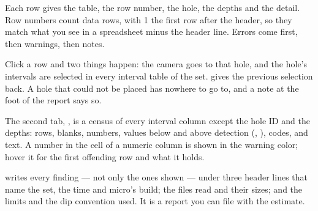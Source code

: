 Each row gives the table, the row number, the hole, the depths and the detail. Row numbers count data rows, with 1 the first row after the header, so they match what you see in a spreadsheet minus the header line. Errors come first, then warnings, then notes.

Click a row and two things happen: the camera goes to that hole, and the hole's intervals are selected in every interval table of the set.  gives the previous selection back. A hole that could not be placed has nowhere to go to, and a note at the foot of the report says so.

The second tab, , is a census of every interval column except the hole ID and the depths: rows, blanks, numbers, values below and above detection (, ), codes, and text. A number in the  cell of a numeric column is shown in the warning color; hover it for the first offending row and what it holds.

 writes every finding — not only the ones shown — under three header lines that name the set, the time and micro's build; the files read and their sizes; and the limits and the dip convention used. It is a report you can file with the estimate.

